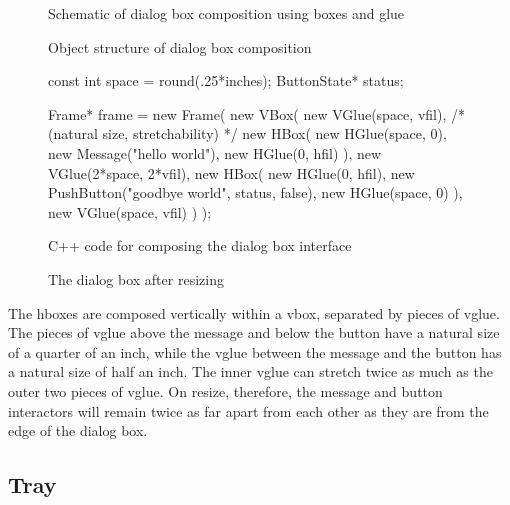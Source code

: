 \begin{figure}
\vspace{2.5in}
\caption{Schematic of dialog box composition using boxes and glue}
\label{alert:schematic}
\end{figure}

\begin{figure}
\vspace{1.5in}
\caption{Object structure of dialog box composition}
\label{alert:structure}
\end{figure}

\begin{figure*}
\begin{code}{.5in}
const int space = round(.25*inches);
ButtonState* status;

Frame* frame = new Frame(
    new VBox(
        new VGlue(space, vfil),         /* (natural size, stretchability) */
        new HBox(
            new HGlue(space, 0),
            new Message("hello world"),
            new HGlue(0, hfil)
        ),
        new VGlue(2*space, 2*vfil),
        new HBox(
            new HGlue(0, hfil),
            new PushButton("goodbye world", status, false),
            new HGlue(space, 0)
        ),
        new VGlue(space, vfil)
    )
);
\end{code}
\vspace{1ex}
\caption{C++ code for composing the dialog box interface}
\label{alert:code}
\end{figure*}

\begin{figure}
\vspace{1.25in}
\caption{The dialog box after resizing}
\label{alert:alert2}
\end{figure}

The hboxes are composed vertically within a vbox, separated by pieces of
vglue.  The pieces of vglue above the message and below the button have a
natural size of a quarter of an inch, while the vglue
between the message and the button has a natural size of half an inch.
The inner vglue can stretch twice as much as the outer two pieces of vglue.
On resize, therefore, the message and button
interactors will remain twice as far apart from each other
as they are from the edge of the dialog box.

    \subsection{Tray}

